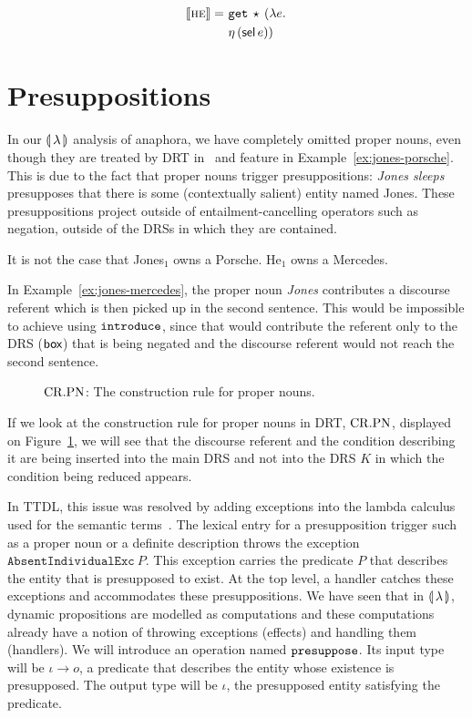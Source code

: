 \begin{align*}
  \llbracket \textsc{he} \rrbracket =\ &\mathtt{get}\,\star\,(\lambda e.\,  \\
                    &\eta\,(\textsf{sel}\,e))
\end{align*}


\section{Presuppositions}
\label{sec:presuppositions}

In our $\llparenthesis \, \lambda \, \rrparenthesis$ analysis of anaphora, we have completely omitted
proper nouns, even though they are treated by DRT
in~\cite{kamp1993discourse} and feature in
Example~\ref{ex:jones-porsche}. This is due to the fact that proper nouns
trigger presuppositions: \emph{Jones sleeps} presupposes that there is some
(contextually salient) entity named Jones. These presuppositions project
outside of entailment-cancelling operators such as negation, outside of the
DRSs in which they are contained.

\begin{exe}
  \ex \label{ex:jones-mercedes} It is not the case that Jones$_1$ owns a
  Porsche. He$_1$ owns a Mercedes.
\end{exe}

In Example~\ref{ex:jones-mercedes}, the proper noun \emph{Jones}
contributes a discourse referent which is then picked up in the second
sentence. This would be impossible to achieve using $\mathtt{introduce}$, since
that would contribute the referent only to the DRS ($\textsf{box}$) that is being
negated and the discourse referent would not reach the second sentence.

\begin{figure}
\centering
\crpnbox
\caption{\label{fig:crpn} $\mathrm{CR.PN}$: The construction rule for proper nouns.}
\end{figure}

If we look at the construction rule for proper nouns in DRT, $\mathrm{CR.PN}$,
displayed on Figure~\ref{fig:crpn}, we will see that the discourse referent
and the condition describing it are being inserted into the main DRS and
not into the DRS $K$ in which the condition being reduced appears.

In TTDL, this issue was resolved by adding exceptions into the lambda
calculus used for the semantic terms~\cite{lebedeva2012expression}. The
lexical entry for a presupposition trigger such as a proper noun or a
definite description throws the exception
$\texttt{AbsentIndividualExc}\ P$. This exception carries the predicate $P$
that describes the entity that is presupposed to exist. At the top level, a
handler catches these exceptions and accommodates these presuppositions. We
have seen that in $\llparenthesis \, \lambda \, \rrparenthesis$, dynamic propositions are modelled as
computations and these computations already have a notion of throwing
exceptions (effects) and handling them (handlers). We will introduce an
operation named $\mathtt{presuppose}$. Its input type will be $\iota \to o$, a
predicate that describes the entity whose existence is presupposed. The
output type will be $\iota$, the presupposed entity satisfying the
predicate.

